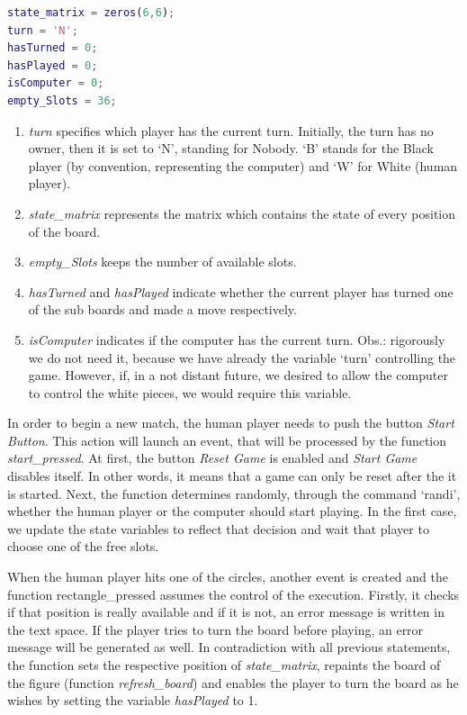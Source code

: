 \begin{lstlisting}[language=Matlab]
% resets matrix of states.
state_matrix = zeros(6,6);
turn = 'N';
hasTurned = 0;
hasPlayed = 0;
isComputer = 0;
empty_Slots = 36;
\end{lstlisting}

\begin{enumerate}
	\item \textit{turn} specifies which player has the current turn. Initially, the
	turn has no owner, then it is set to ‘N’, standing for Nobody. ‘B’ stands for
	the Black player (by convention, representing the computer) and ‘W’ for White
	(human player).
	\item \textit{state\_matrix} represents the matrix which contains the state of
	every position of the board.
	\item \textit{empty\_Slots} keeps the number of available slots.
	\item \textit{hasTurned} and \textit{hasPlayed} indicate whether the current
	player has turned one of the sub boards and made a move respectively.
	\item \textit{isComputer} indicates if the computer has the current turn. Obs.:
	rigorously we do not need it, because we have already the variable ‘turn’
	controlling the game. However, if, in a not distant future, we desired to
	allow the computer to control the white pieces, we would require this
	variable.
\end{enumerate}

In order to begin a new match, the human player needs to push the button
\textit{Start Button}.  This action will launch an event, that will be processed
by the function \textit{start\_pressed}. At first, the button \textit{Reset
Game} is enabled and \textit{Start Game} disables itself. In other words, it
means that a game can only be reset after the it is started. Next, the function
determines randomly, through the command ‘randi’, whether the human player or
the computer should start playing.  In the first case, we update the state
variables to reflect that decision and wait that player to choose one of the
free slots.

\vspace{10pt}

 When the human player hits one of the circles, another event is created and the
 function rectangle\_pressed assumes the control of the execution. Firstly, it
 checks if that position is really available and if it is not, an error message
 is written in the text space. If the player tries to turn the board before
 playing, an error message will be generated as well. In contradiction with all
 previous statements, the function sets the respective position of
 \textit{state\_matrix}, repaints the board of the figure (function
 \textit{refresh\_board}) and enables the player to turn the board as he wishes
 by setting the variable \textit{hasPlayed} to 1.
 

